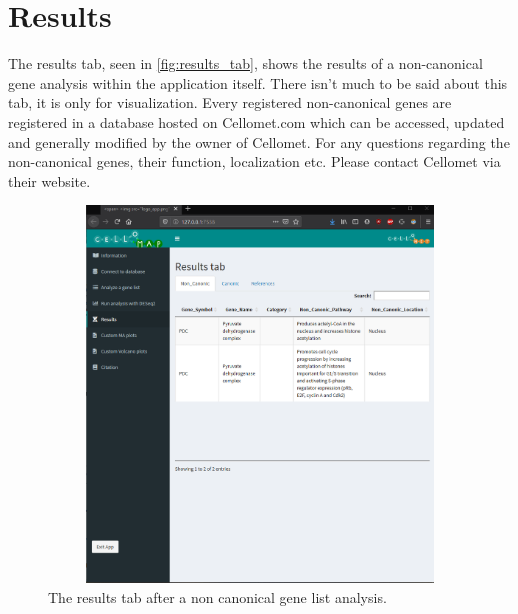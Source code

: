 \documentclass[11pt]{article}
\begin{document}
\section{Results \label{res}}
The results tab, seen in \autoref{fig:results_tab}, shows the results of a non-canonical gene analysis within the application itself. There isn't much to be said about this tab, it is only for visualization.
Every registered non-canonical genes are registered in a database hosted on Cellomet.com which can be accessed, updated and generally modified by the owner of Cellomet. For any questions regarding the non-canonical genes, their function, localization etc. Please contact Cellomet via their website.

\begin{figure}[h!]
\centering
\includegraphics[width=15cm,height=10cm,keepaspectratio]{results_tab.png}
\caption{The results tab after a non canonical gene list analysis.}
\label{fig:results_tab}
\end{figure}

\newpage
\end{document}
